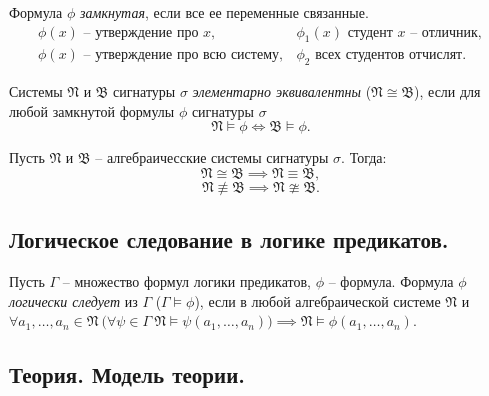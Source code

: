 \begin{definition}
    Формула $ \phi $ \emph{замкнутая}, если все ее переменные связанные.
    \[
        \begin{array}{ll}
            \phi(x) \text{ -- утверждение про }x,           & \phi_1(x) \text{ студент }x \text{ -- отличник}, \\
            \phi(x) \text{ -- утверждение про всю систему}, & \phi_2 \text{ всех студентов отчислят}.
        \end{array}
    \]
\end{definition}

\begin{definition}
    Системы $ \mathfrak{N} $ и $ \mathfrak{B} $ сигнатуры $ \sigma $ \emph{элементарно эквивалентны} ($ \mathfrak{N} \cong \mathfrak{B} $), если для любой замкнутой формулы $ \phi $ сигнатуры $ \sigma $
    \[
        \mathfrak{N} \vDash \phi \iff \mathfrak{B} \vDash \phi.
    \]
\end{definition}

\begin{theorem}
    Пусть $ \mathfrak{N} $ и $ \mathfrak{B} $ -- алгебраичесские системы сигнатуры $ \sigma $. Тогда:
    \[
        \mathfrak{N} \cong \mathfrak{B} \implies \mathfrak{N} \equiv \mathfrak{B},
    \]
    \[
        \mathfrak{N} \nequiv \mathfrak{B} \implies \mathfrak{N} \ncong \mathfrak{B}.
    \]
\end{theorem}

\subsection{Логическое следование в логике предикатов.}

\begin{definition}
    Пусть $ \Gamma $ -- множество формул логики предикатов, $ \phi $ -- формула. Формула $ \phi $ \emph{логически следует} из $ \Gamma $ ($ \Gamma \vDash \phi $), если в любой алгебраической системе $ \mathfrak{N} $ и $ \forall a_1,\ldots,a_n \in \mathfrak{N} \ \big( \forall \psi \in \Gamma \ \mathfrak{N} \vDash \psi(a_1,\ldots,a_n) \big) \implies \mathfrak{N} \vDash \phi(a_1,\ldots,a_n) $.
\end{definition}

\subsection{Теория. Модель теории.}

